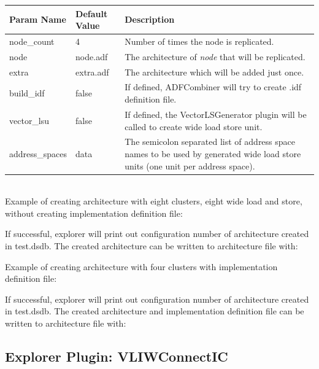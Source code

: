 \documentclass[a4paper,twoside]{tceusermanual}
\begin{document}
\begin{tabular}{p{}p{}
                p{}}
\textbf{Param Name} &\textbf{Default Value} &\textbf{Description} \\
\hline
node\_count & 4 & Number of times the node is replicated. \\
node & node.adf & The architecture of \textit{node} that will be replicated. \\
extra & extra.adf & The architecture which will be added just once. \\
build\_idf & false & If defined, ADFCombiner will try to create .idf definition file. \\
vector\_lsu & false & If defined, the VectorLSGenerator plugin will be called to create wide load store unit. \\
address\_spaces & data & The semicolon separated list of address space names to be used by generated wide load store units (one unit per address space). \\ 
\end{tabular}\\

Example of creating architecture with eight clusters, eight wide load and store,  without creating implementation
definition file:


If successful, explorer will print out configuration number of architecture created in test.dsdb.
The created architecture can be written to architecture file with:


Example of creating architecture with four clusters with implementation
definition file:


If successful, explorer will print out configuration number of architecture created in test.dsdb.
The created architecture and implementation definition file can be written to architecture file with:


\subsection{Explorer Plugin: VLIWConnectIC}
\end{document}
